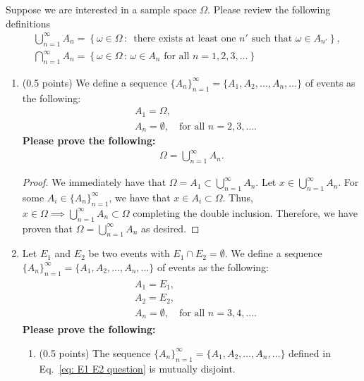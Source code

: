\documentclass[11pt]{article}
\begin{document}
Suppose we are interested in a sample space $\Omega$. Please review the following definitions
\begin{align*}
& \bigcup_{n=1}^\infty A_n=\left\{\omega\in\Omega \,:\, \mbox{ there exists at least one }n'\mbox{ such that }\omega\in A_{n'}\right\}, \\
& \bigcap_{n=1}^\infty A_n=\left\{\omega\in\Omega \,:\, \omega\in A_n \mbox{ for all }n=1,2,3,\ldots\right\}
\end{align*}
\begin{enumerate}
\item (0.5 points) We define a sequence $\{A_n\}_{n=1}^\infty=\{A_1, A_2,\ldots,A_n,\ldots\}$ of events as the following: 
\begin{align*}
& A_1=\Omega,\\
& A_n=\emptyset,\ \ \ \mbox{ for all }n=2,3,\ldots.
\end{align*}
\textbf{Please prove the following:}
\begin{align}\label{eq: infinite union example}
\Omega=\bigcup_{n=1}^\infty A_n.
\end{align}

\begin{proof}
  We immediately have that \(\Omega=A_1\subset \bigcup_{n=1}^\infty A_n\). 
  Let \(x\in\bigcup_{n=1}^\infty A_n\). For some \(A_i\in \{A_n\}^{\infty}_{n=1}\), we have that \(x\in A_i\subset\Omega\). Thus, \(x\in\Omega\implies \bigcup_{n=1}^\infty A_n\subset\Omega\)
  completing the double inclusion. Therefore, we have proven that \(\Omega = \bigcup_{n=1}^\infty A_n\) as desired.
\end{proof}

\item Let $E_1$ and $E_2$ be two events with $E_1\cap E_2=\emptyset$. We define a sequence $\{A_n\}_{n=1}^\infty=\{A_1, A_2,\ldots,A_n,\ldots\}$ of events as the following: 
\begin{align}\label{eq: E1 E2 question}
\begin{aligned}
& A_1=E_1,\\
& A_2=E_2,\\
& A_n=\emptyset,\ \ \ \mbox{ for all }n=3,4,\ldots.
\end{aligned}
\end{align}
\textbf{Please prove the following:}
\begin{enumerate}
\item (0.5 points) The sequence $\{A_n\}_{n=1}^\infty=\{A_1, A_2,\ldots,A_n,\ldots\}$ defined in Eq.~\eqref{eq: E1 E2 question} is mutually disjoint.


\end{enumerate}
\end{enumerate}
\end{document}
